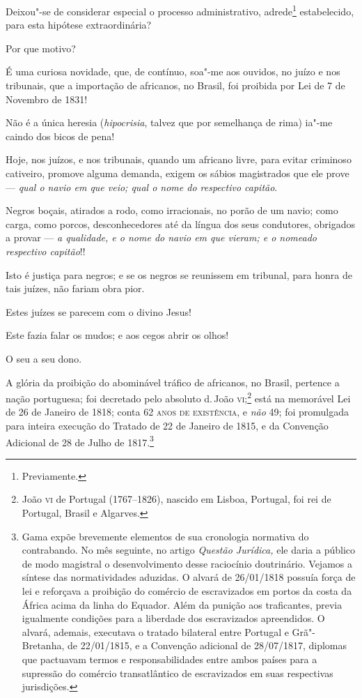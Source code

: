 Deixou"-se de considerar especial o processo administrativo,
adrede\footnote{Previamente.} estabelecido, para esta hipótese
extraordinária?

Por que motivo?

\asterisc

É uma curiosa novidade, que, de contínuo, soa"-me aos ouvidos, no juízo e
nos tribunais, que a importação de africanos, no Brasil, foi proibida
por Lei de 7 de Novembro de 1831!

Não é a única heresia (\emph{hipocrisia}, talvez que por semelhança de
rima) ia"-me caindo dos bicos de pena!

Hoje, nos juízos, e nos tribunais, quando um africano livre, para evitar
criminoso cativeiro, promove alguma demanda, exigem os sábios
magistrados que ele prove --- \emph{qual o navio em que veio; qual o nome
do respectivo capitão}.

Negros boçais, atirados a rodo, como irracionais, no porão de um navio;
como carga, como porcos, desconhecedores até da língua dos seus
condutores, obrigados a provar --- \emph{a qualidade, e o nome do navio em
que vieram; e o nomeado respectivo capitão}!!

Isto é justiça para negros; e se os negros se reunissem em tribunal,
para honra de tais juízes, não fariam obra pior.

Estes juízes se parecem com o divino Jesus!

Este fazia falar os mudos; e aos cegos abrir os olhos!

\asterisc

O seu a seu dono.

A glória da proibição do abominável tráfico de africanos, no Brasil,
pertence a nação portuguesa; foi decretado pelo absoluto d.\,João
\textsc{vi};\footnote{João \textsc{vi} de Portugal (1767--1826), nascido em Lisboa,
  Portugal, foi rei de Portugal, Brasil e Algarves.} está na memorável
Lei de 26 de Janeiro de 1818; conta 62 \textsc{anos de existência}, e \emph{não}
49; foi promulgada para inteira execução do Tratado de 22 de Janeiro de
1815, e da Convenção Adicional de 28 de Julho de 1817.\footnote{Gama
  expõe brevemente elementos de sua cronologia normativa do contrabando.
  No mês seguinte, no artigo \emph{Questão Jurídica,} ele daria a
  público de modo magistral o desenvolvimento desse raciocínio
  doutrinário. Vejamos a síntese das normatividades aduzidas. O alvará
  de 26/01/1818 possuía força de lei e reforçava a proibição do comércio
  de escravizados em portos da costa da África acima da linha do
  Equador. Além da punição aos traficantes, previa igualmente condições
  para a liberdade dos escravizados apreendidos. O alvará, ademais,
  executava o tratado bilateral entre Portugal e Grã"-Bretanha, de
  22/01/1815, e a Convenção adicional de 28/07/1817, diplomas que
  pactuavam termos e responsabilidades entre ambos países para a
  supressão do comércio transatlântico de escravizados em suas
  respectivas jurisdições.}

